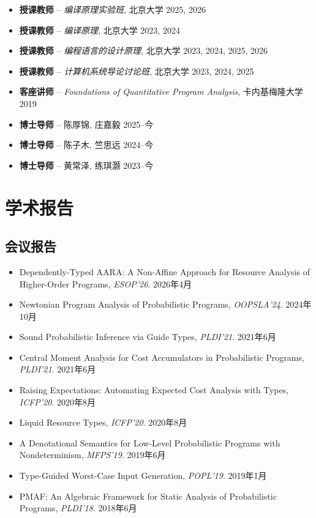 \documentclass[11pt,letterpaper,sans]{moderncv}
\begin{document}
\begin{itemize}
  \item \textbf{授课教师} -- \emph{编译原理实验班}, 北京大学 \hfill 2025, 2026
  \item \textbf{授课教师} -- \emph{编译原理}, 北京大学 \hfill 2023, 2024
  \item \textbf{授课教师} -- \emph{编程语言的设计原理}, 北京大学 \hfill 2023, 2024, 2025, 2026
  \item \textbf{授课教师} -- \emph{计算机系统导论讨论班}, 北京大学 \hfill 2023, 2024, 2025
  \item \textbf{客座讲师} -- \emph{Foundations of Quantitative Program Analysis}, 卡内基梅隆大学 \hfill 2019

  \vspace{4pt}

  \item \textbf{博士导师} -- 陈厚锦, 庄嘉毅 \hfill 2025--今
  \item \textbf{博士导师} -- 陈子木, 竺思远 \hfill 2024--今
  \item \textbf{博士导师} -- 黄常泽, 练琪灏 \hfill 2023--今
\end{itemize}

\section{学术报告}

\subsection{会议报告}

\begin{itemize}
  \item {Dependently-Typed AARA: A Non-Affine Approach for Resource Analysis of Higher-Order Programs}, \emph{ESOP'26}. \hfill 2026年4月
  \item {Newtonian Program Analysis of Probabilistic Programs}, \emph{OOPSLA'24}. \hfill 2024年10月
  \item {Sound Probabilistic Inference via Guide Types}, \emph{PLDI'21}. \hfill 2021年6月
  \item {Central Moment Analysis for Cost Accumulators in Probabilistic Programs}, \emph{PLDI'21}. \hfill 2021年6月
  \item {Raising Expectations: Automating Expected Cost Analysis with Types}, \emph{ICFP'20}. \hfill 2020年8月
  \item {Liquid Resource Types}, \emph{ICFP'20}. \hfill 2020年8月
  \item {A Denotational Semantics for Low-Level Probabilistic Programs with Nondeterminism}, \emph{MFPS'19}. \hfill 2019年6月
  \item {Type-Guided Worst-Case Input Generation}, \emph{POPL'19}. \hfill 2019年1月
  \item {PMAF: An Algebraic Framework for Static Analysis of Probabilistic Programs}, \emph{PLDI'18}. \hfill 2018年6月
\end{itemize}
\end{document}
